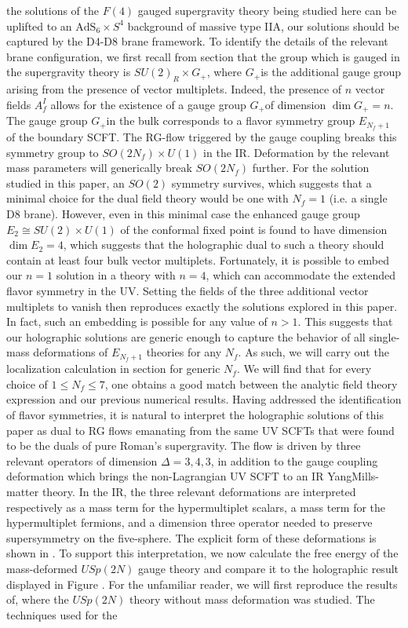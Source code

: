 \documentclass{article}
\begin{document}
the solutions of the \(F(4)\) gauged supergravity theory being studied here can be uplifted to an \(\mathrm{AdS}_{6} \times S^{4}\) background of massive type IIA, our solutions should be captured by the D4-D8 brane framework. To identify the details of the relevant brane configuration, we first recall from section that the group which is gauged in the supergravity theory is \(S U(2)_{R} \times G_{+}\), where \(G_{+}\)is the additional gauge group arising from the presence of vector multiplets. Indeed, the presence of \(n\) vector fields \(A_{f}^{I}\) allows for the existence of a gauge group \(G_{+}\)of dimension \(\operatorname{dim} G_{+}=n\). The gauge group \(G_{+}\)in the bulk corresponds to a flavor symmetry group \(E_{N_{f}+1}\) of the boundary SCFT. The RG-flow triggered by the gauge coupling breaks this symmetry group to \(S O\left(2 N_{f}\right) \times U(1)\) in the IR. Deformation by the relevant mass parameters will generically break \(S O\left(2 N_{f}\right)\) further. For the solution studied in this paper, an \(S O(2)\) symmetry survives, which suggests that a minimal choice for the dual field theory would be one with \(N_{f}=1\) (i.e. a single D8 brane). However, even in this minimal case the enhanced gauge group \(E_{2} \cong S U(2) \times U(1)\) of the conformal fixed point is found to have dimension \(\operatorname{dim} E_{2}=4\), which suggests that the holographic dual to such a theory should contain at least four bulk vector multiplets. Fortunately, it is possible to embed our \(n=1\) solution in a theory with \(n=4\), which can accommodate the extended flavor symmetry in the UV. Setting the fields of the three additional vector multiplets to vanish then reproduces exactly the solutions explored in this paper. In fact, such an embedding is possible for any value of \(n>1\). This suggests that our holographic solutions are generic enough to capture the behavior of all single-mass deformations of \(E_{N_{f}+1}\) theories for any \(N_{f}\). As such, we will carry out the localization calculation in section for generic \(N_{f}\). We will find that for every choice of \(1 \leq N_{f} \leq 7\), one obtains a good match between the analytic field theory expression and our previous numerical results. Having addressed the identification of flavor symmetries, it is natural to interpret the holographic solutions of this paper as dual to RG flows emanating from the same UV SCFTs that were found to be the duals of pure Roman's supergravity. The flow is driven by three relevant operators of dimension \(\Delta=3,4,3\), in addition to the gauge coupling deformation which brings the non-Lagrangian UV SCFT to an IR YangMills-matter theory. In the IR, the three relevant deformations are interpreted respectively as a mass term for the hypermultiplet scalars, a mass term for the hypermultiplet fermions, and a dimension three operator needed to preserve supersymmetry on the five-sphere. The explicit form of these deformations is shown in . To support this interpretation, we now calculate the free energy of the mass-deformed \(U S p(2 N)\) gauge theory and compare it to the holographic result displayed in Figure . For the unfamiliar reader, we will first reproduce the results of, where the \(U S p(2 N)\) theory without mass deformation was studied. The techniques used for the 
\end{document}
